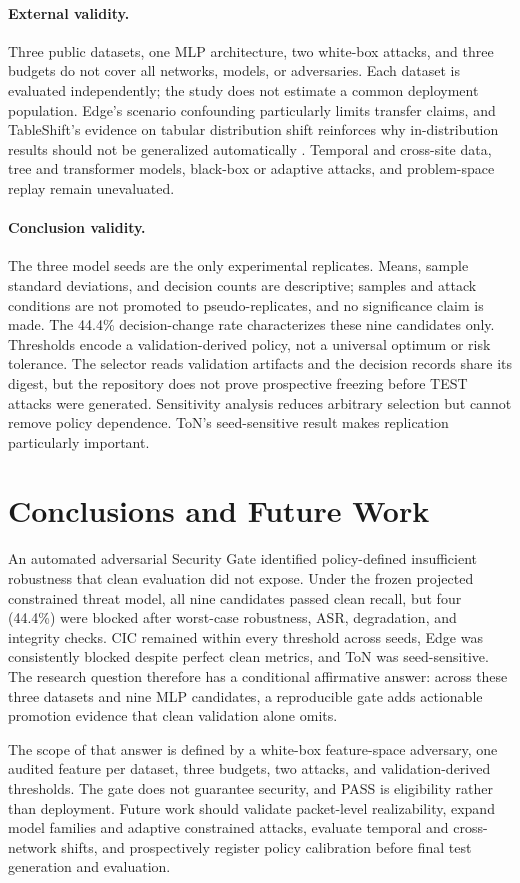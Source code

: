 \documentclass[runningheads]{llncs}
\begin{document}
\paragraph{External validity.} Three public datasets, one MLP architecture, two white-box attacks, and three budgets do not cover all networks, models, or adversaries. Each dataset is evaluated independently; the study does not estimate a common deployment population. Edge's scenario confounding particularly limits transfer claims, and TableShift's evidence on tabular distribution shift reinforces why in-distribution results should not be generalized automatically \cite{gardner2023tableshift}. Temporal and cross-site data, tree and transformer models, black-box or adaptive attacks, and problem-space replay remain unevaluated.

\paragraph{Conclusion validity.} The three model seeds are the only experimental replicates. Means, sample standard deviations, and decision counts are descriptive; samples and attack conditions are not promoted to pseudo-replicates, and no significance claim is made. The 44.4\% decision-change rate characterizes these nine candidates only. Thresholds encode a validation-derived policy, not a universal optimum or risk tolerance. The selector reads validation artifacts and the decision records share its digest, but the repository does not prove prospective freezing before TEST attacks were generated. Sensitivity analysis reduces arbitrary selection but cannot remove policy dependence. ToN's seed-sensitive result makes replication particularly important.

\section{Conclusions and Future Work}
An automated adversarial Security Gate identified policy-defined insufficient robustness that clean evaluation did not expose. Under the frozen projected constrained threat model, all nine candidates passed clean recall, but four (44.4\%) were blocked after worst-case robustness, ASR, degradation, and integrity checks. CIC remained within every threshold across seeds, Edge was consistently blocked despite perfect clean metrics, and ToN was seed-sensitive. The research question therefore has a conditional affirmative answer: across these three datasets and nine MLP candidates, a reproducible gate adds actionable promotion evidence that clean validation alone omits.

The scope of that answer is defined by a white-box feature-space adversary, one audited feature per dataset, three budgets, two attacks, and validation-derived thresholds. The gate does not guarantee security, and PASS is eligibility rather than deployment. Future work should validate packet-level realizability, expand model families and adaptive constrained attacks, evaluate temporal and cross-network shifts, and prospectively register policy calibration before final test generation and evaluation.



\end{document}
